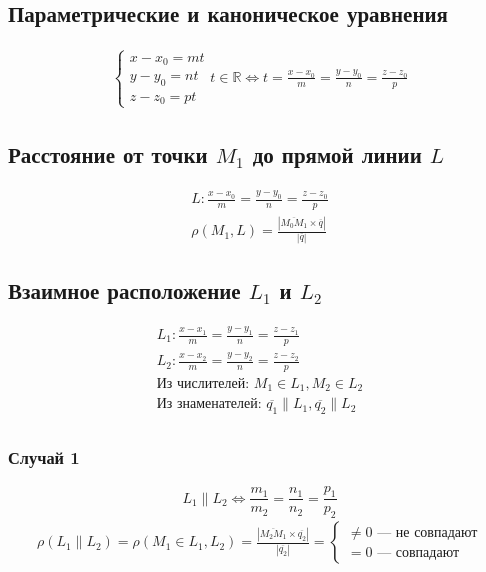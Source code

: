 \documentclass{article}
\begin{document}
\subsection{Параметрические и каноническое уравнения}
\begin{gather*}
    \begin{cases}
        x - x_0 = mt \\
        y - y_0 = nt \\
        z - z_0 = pt
    \end{cases} t \in \mathbb{R} 
    \Leftrightarrow t = \frac{x - x_0}{m} = \frac{y - y_0}{n} = \frac{z - z_0}{p}
\end{gather*}


\subsection{Расстояние от точки $M_1$ до прямой линии $L$}
\begin{gather*}
    L: \frac{x - x_0}{m} = \frac{y - y_0}{n} = \frac{z - z_0}{p} \\
    \rho(M_1, L) = \frac{\left| \overline{M_0 M_1} \times \overline{q} \right|}{\left| \overline{q} \right|}
\end{gather*}


\subsection{Взаимное расположение $L_1$ и $L_2$}
\begin{gather*}
    L_1: \frac{x - x_1}{m} = \frac{y - y_1}{n} = \frac{z - z_1}{p} \\
    L_2: \frac{x - x_2}{m} = \frac{y - y_2}{n} = \frac{z - z_2}{p} \\
    \text{Из числителей: }   M_1 \in L_1, M_2 \in L_2 \\
    \text{Из знаменателей: } \overline{q_1} \parallel L_1, \overline{q_2} \parallel L_2 \\
\end{gather*}

\subsubsection{Случай 1}
\[
    L_1 \parallel L_2 \Leftrightarrow \frac{m_1}{m_2} = \frac{n_1}{n_2} = \frac{p_1}{p_2}
\]
\begin{gather*}
    \rho(L_1 \parallel L_2) = 
    \rho(M_1 \in L_1, L_2) = 
    \frac{\left| \overline{M_2 M_1} \times \overline{q_2} \right|}{\left| \overline{q_2} \right|} =
    \begin{cases}
        \neq 0 \text{ --- не совпадают} \\
           = 0 \text{ --- совпадают}
    \end{cases}
\end{gather*}
\end{document}
